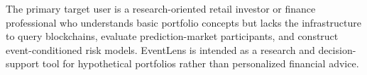 The primary target user is a research-oriented retail investor or finance professional who understands basic portfolio concepts but lacks the infrastructure to query blockchains, evaluate prediction-market participants, and construct event-conditioned risk models. EventLens is intended as a research and decision-support tool for hypothetical portfolios rather than personalized financial advice.
